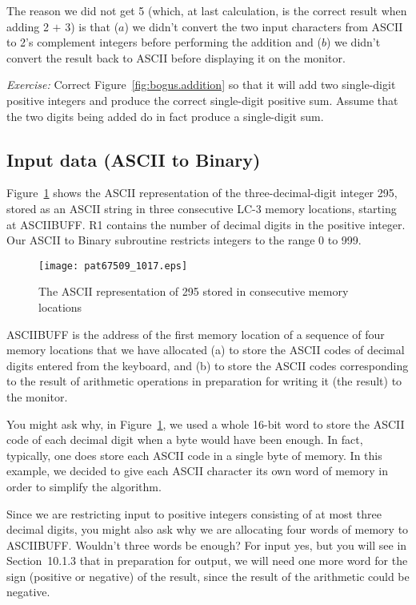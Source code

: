 \documentclass{patt}
\begin{document}
The reason we did not get 5 (which, at last calculation, is the
correct result when adding 2 $+$ 3) is that ($a$) we didn't convert
the two input characters from ASCII to 2's complement integers before
performing the addition and ($b$) we didn't convert the result back to 
ASCII before displaying it on the monitor.

{\em Exercise:} Correct Figure~\ref{fig:bogus.addition} so that it
will add two single-digit positive integers and produce the correct 
single-digit positive sum.  Assume that the two digits being added do in fact
produce a single-digit sum.

\FloatBarrier
\subsection{Input data (ASCII to Binary)}

Figure~\ref{fig:asciibuff.295} shows the ASCII
representation of the three-decimal-digit integer 295, stored as an ASCII
string in three consecutive LC-3 memory locations, starting at ASCIIBUFF. 
R1 contains the number of decimal digits in the positive integer.
Our ASCII to Binary subroutine restricts integers to the range 0 to 999.

\begin{figure}[h!]
\centerline{\texttt{[image: pat67509\_1017.eps]}}
\caption{The ASCII representation of 295 stored in consecutive memory locations}
\label{fig:asciibuff.295}
\end{figure}

ASCIIBUFF is the address of the first memory location of a sequence of four 
memory locations that we have allocated (a) to store the ASCII codes of decimal 
digits entered from the keyboard, and (b) to store the ASCII codes 
corresponding to the result of arithmetic operations in preparation for 
writing it (the result) to the monitor.

You might ask why, in Figure~\ref{fig:asciibuff.295}, we used a whole 16-bit 
word to store the ASCII code of each decimal digit when a byte would have been 
enough.  In fact, typically, one does store each ASCII code in a single byte
of memory.  In this example, we decided to give each ASCII character its own 
word of memory in order to simplify the algorithm.

Since we are restricting input to positive integers consisting of at most 
three decimal digits, you might also ask why we are allocating four words of
memory to ASCIIBUFF.  Wouldn't three words be enough?  For input yes, but you 
will see in Section~10.1.3 that in preparation for output, we will need one
more word for the sign (positive or negative) of the result, since the result
of the arithmetic could be negative.
\end{document}
